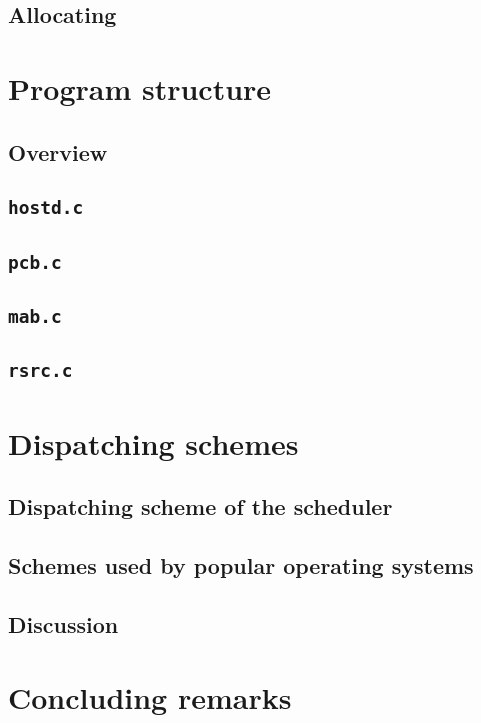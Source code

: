 \documentclass[12pt]{article}
\begin{document}
\subsection{Allocating}

\section{Program structure}

\subsection{Overview}

\subsection{\tt{hostd.c}}

\subsection{\tt{pcb.c}}

\subsection{\tt{mab.c}}

\subsection{\tt{rsrc.c}}

\section{Dispatching schemes}

\subsection{Dispatching scheme of the scheduler}

\subsection{Schemes used by popular operating systems}

\subsection{Discussion}

\section{Concluding remarks}



\end{document}
